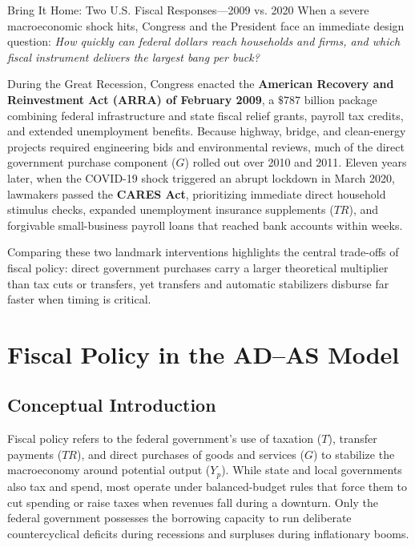 \documentclass[11pt,letterpaper]{article}
\begin{document}
\begin{examplecase}{Bring It Home: Two U.S. Fiscal Responses---2009 vs. 2020}
When a severe macroeconomic shock hits, Congress and the President face an immediate design question: \emph{How quickly can federal dollars reach households and firms, and which fiscal instrument delivers the largest bang per buck?}

During the Great Recession, Congress enacted the \textbf{American Recovery and Reinvestment Act (ARRA) of February 2009}, a $\$787\text{ billion}$ package combining federal infrastructure and state fiscal relief grants, payroll tax credits, and extended unemployment benefits. Because highway, bridge, and clean-energy projects required engineering bids and environmental reviews, much of the direct government purchase component ($G$) rolled out over 2010 and 2011. Eleven years later, when the COVID-19 shock triggered an abrupt lockdown in March 2020, lawmakers passed the \textbf{CARES Act}, prioritizing immediate direct household stimulus checks, expanded unemployment insurance supplements ($TR$), and forgivable small-business payroll loans that reached bank accounts within weeks.

Comparing these two landmark interventions highlights the central trade-offs of fiscal policy: direct government purchases carry a larger theoretical multiplier than tax cuts or transfers, yet transfers and automatic stabilizers disburse far faster when timing is critical.
\end{examplecase}

\section{Fiscal Policy in the AD--AS Model}

\subsection*{Conceptual Introduction}
Fiscal policy refers to the federal government's use of taxation ($T$), transfer payments ($TR$), and direct purchases of goods and services ($G$) to stabilize the macroeconomy around potential output ($Y_p$). While state and local governments also tax and spend, most operate under balanced-budget rules that force them to cut spending or raise taxes when revenues fall during a downturn. Only the federal government possesses the borrowing capacity to run deliberate countercyclical deficits during recessions and surpluses during inflationary booms.
\end{document}
